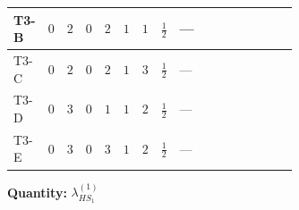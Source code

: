 \documentclass[8pt]{article}
\begin{document}
\begin{landscape}
\begin{longtable}{@{}llcccccc >{\raggedright\arraybackslash}p{0.21\linewidth} >{\raggedright\arraybackslash}p{0.21\linewidth} >{\raggedright\arraybackslash}p{0.21\linewidth}@{}}
\midrule
T3-B & $0$ & $2$ & $0$ & $2$ & $1$ & $1$ & $\frac{1}{2}$ & --- & \scriptsize\adjustbox{max width=\linewidth}{$\begin{gathered} -2 \operatorname{Tr}\!\left({y_1}\,\left({y_1}\right)^{\dagger}\,{Y_e}\,\left({Y_e}\right)^{\dagger}\right)\end{gathered}$} & \scriptsize\adjustbox{max width=\linewidth}{$\begin{gathered} +6 {\lambda_5} \left({\lambda_5}\right)^{*}\end{gathered}$} \\
\midrule
T3-C & $0$ & $2$ & $0$ & $2$ & $1$ & $3$ & $\frac{1}{2}$ & --- & \scriptsize\adjustbox{max width=\linewidth}{$\begin{gathered} -3 \operatorname{Tr}\!\left({y_1}\,\left({y_1}\right)^{\dagger}\,{Y_e}\,\left({Y_e}\right)^{\dagger}\right)\end{gathered}$} & \scriptsize\adjustbox{max width=\linewidth}{$\begin{gathered} +6 {\lambda_5} \left({\lambda_5}\right)^{*}\end{gathered}$} \\
\midrule
T3-D & $0$ & $3$ & $0$ & $1$ & $1$ & $2$ & $\frac{1}{2}$ & --- & \scriptsize\adjustbox{max width=\linewidth}{$\begin{gathered} -2 \operatorname{Tr}\!\left({y_1}\,\left({y_1}\right)^{\dagger}\,{Y_e}\,\left({Y_e}\right)^{\dagger}\right)\end{gathered}$} & \scriptsize\adjustbox{max width=\linewidth}{$\begin{gathered} +4 {\lambda_5} \left({\lambda_5}\right)^{*}\end{gathered}$} \\
\midrule
T3-E & $0$ & $3$ & $0$ & $3$ & $1$ & $2$ & $\frac{1}{2}$ & --- & \scriptsize\adjustbox{max width=\linewidth}{$\begin{gathered} -2 \operatorname{Tr}\!\left({y_1}\,\left({y_1}\right)^{\dagger}\,{Y_e}\,\left({Y_e}\right)^{\dagger}\right)\end{gathered}$} & \scriptsize\adjustbox{max width=\linewidth}{$\begin{gathered} +4 {\lambda_5} \left({\lambda_5}\right)^{*}\end{gathered}$} \\
\midrule
\bottomrule
\end{longtable}
\clearpage
\noindent\textbf{Quantity: }$\lambda_{HS_1}^{(1)}$\par\smallskip

\end{landscape}
\end{document}
